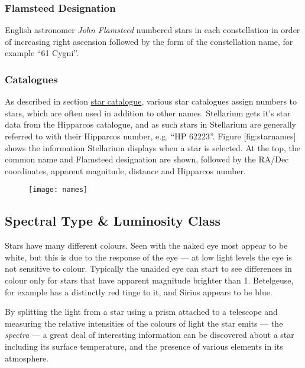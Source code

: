 \subsubsection{Flamsteed Designation}
\label{sec:concepts:Flamsteed}

English astronomer \emph{John Flamsteed} numbered stars in each
constellation in order of increasing right ascension followed by the
form of the constellation name, for example ``61 Cygni''.

\subsubsection{Catalogues}\label{catalogues}

As described in section \href{Star_Catalogue}{star catalogue}, various
star catalogues assign numbers to stars, which are often used in
addition to other names. Stellarium gets it's star data from the
Hipparcos catalogue, and as such stars in Stellarium are generally
referred to with their Hipparcos number, e.g. ``HP 62223''. Figure
{[}fig:starnames{]} shows the information Stellarium displays when a
star is selected. At the top, the common name and Flamsteed designation
are shown, followed by the RA/Dec coordinates, apparent magnitude,
distance and Hipparcos number.

\begin{figure}[h]
\centering\texttt{[image: names]}
\end{figure}

\subsection{Spectral Type \& Luminosity
Class}\label{spectral-type-luminosity-class}

Stars have many different colours. Seen with the naked eye most appear
to be white, but this is due to the response of the eye --- at low light
levels the eye is not sensitive to colour. Typically the unaided eye can
start to see differences in colour only for stars that have apparent
magnitude brighter than 1. Betelgeuse, for example has a distinctly red
tinge to it, and Sirius appears to be blue.

By splitting the light from a star using a prism attached to a telescope
and measuring the relative intensities of the colours of light the star
emits --- the \emph{spectra} --- a great deal of interesting information
can be discovered about a star including its surface temperature, and
the presence of various elements in its atmosphere.

